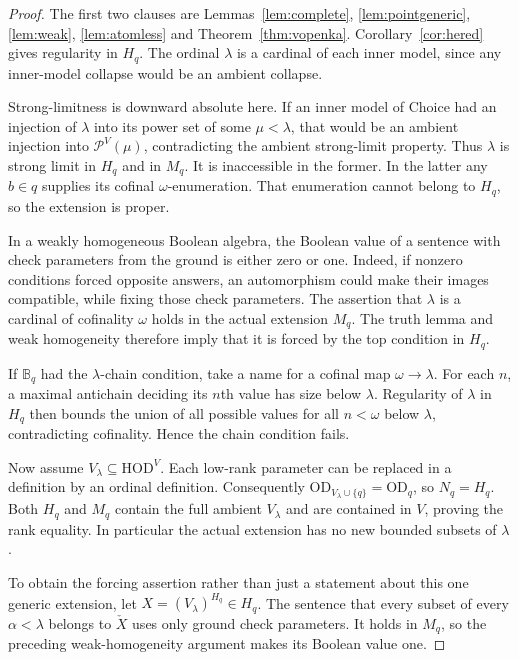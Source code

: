 \documentclass[11pt,letterpaper]{article}
\theoremstyle{definition}
\numberwithin{equation}{section}
\newcommand{\HOD}{\mathrm{HOD}}
\newcommand{\OD}{\mathrm{OD}}
\newcommand{\Pow}{\mathcal P}
\newcommand{\BB}{\mathbb B}
\begin{document}
\begin{proof}
The first two clauses are Lemmas~\ref{lem:complete},
\ref{lem:pointgeneric}, \ref{lem:weak}, \ref{lem:atomless} and
Theorem~\ref{thm:vopenka}. Corollary~\ref{cor:hered} gives regularity in
$H_q$. The ordinal $\lambda$ is a cardinal of each inner model, since
any inner-model collapse would be an ambient collapse.

Strong-limitness is downward absolute here. If an inner model of Choice
had an injection of $\lambda$ into its power set of some $\mu<\lambda$,
that would be an ambient injection into $\Pow^V(\mu)$, contradicting the
ambient strong-limit property. Thus $\lambda$ is strong limit in $H_q$
and in $M_q$. It is inaccessible in the former. In the latter any
$b\in q$ supplies its cofinal $\omega$-enumeration. That enumeration
cannot belong to $H_q$, so the extension is proper.

In a weakly homogeneous Boolean algebra, the Boolean value of a sentence
with check parameters from the ground is either zero or one. Indeed,
if nonzero conditions forced opposite answers, an automorphism could
make their images compatible, while fixing those check parameters.
The assertion that $\lambda$ is a cardinal of cofinality $\omega$ holds
in the actual extension $M_q$. The truth lemma and weak homogeneity
therefore imply that it is forced by the top condition in $H_q$.

If $\BB_q$ had the $\lambda$-chain condition, take a name for a cofinal
map $\omega\to\lambda$. For each $n$, a maximal antichain deciding its
$n$th value has size below $\lambda$. Regularity of $\lambda$ in $H_q$
then bounds the union of all possible values for all $n<\omega$ below
$\lambda$, contradicting cofinality. Hence the chain condition fails.

Now assume $V_\lambda\subseteq\HOD^V$. Each low-rank parameter can be
replaced in a definition by an ordinal definition. Consequently
$\OD_{V_\lambda\cup\{q\}}=\OD_q$, so $N_q=H_q$.
Both $H_q$ and $M_q$ contain the full ambient $V_\lambda$ and are
contained in $V$, proving the rank equality. In particular the actual
extension has no new bounded subsets of $\lambda$.

To obtain the forcing assertion rather than just a statement about this
one generic extension, let $X=(V_\lambda)^{H_q}\in H_q$. The sentence
that every subset of every $\alpha<\lambda$ belongs to $\check X$
uses only ground check parameters. It holds in $M_q$, so the preceding
weak-homogeneity argument makes its Boolean value one.
\end{proof}
\end{document}
